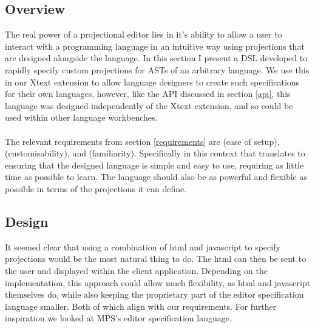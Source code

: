 \documentclass{article}
\begin{document}
\subsection{Overview}
The real power of a projectional editor lies in it's ability to allow a user to interact with a programming language in an intuitive way using projections that are designed alongside the language. In this section I present a DSL developed to rapidly specify custom projections for ASTs of an arbitrary language. We use this in our Xtext extension to allow language designers to create such specifications for their own languages, however, like the API discussed in section \ref{api}, this language was designed independently of the Xtext extension, and so could be used within other language workbenches.
\\
\\
The relevant requirements from section \ref{requirements} are \RSetup (ease of setup), \RCustom (customisability), and \RFamiliarity (familiarity). Specifically in this context that translates to ensuring that the designed language is simple and easy to use, requiring as little time as possible to learn. The language should also be as powerful and flexible as possible in terms of the projections it can define.

\subsection{Design}

It seemed clear that using a combination of html and javascript to specify projections would be the most natural thing to do. The html can then be sent to the user and displayed within the client application. Depending on the implementation, this approach could allow much flexibility, as html and javascript themselves do, while also keeping the proprietary part of the editor specification language smaller. Both of which align with our requirements. For further inspiration we looked at MPS's editor specification language.
\end{document}

